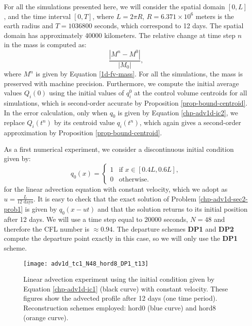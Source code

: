 For all the simulations presented here, we will consider the spatial domain $[0,L]$,
and the time interval $[0,T]$,  where $L = 2 \pi R$, $R = 6.371 \times 10^{6}$ meters is the earth radius and
$T = 1036800$ seconds, which correspond to 12 days. The spatial domain has approximately 40000 kilometers.
The relative change at time step $n$ in the mass is computed as:
\begin{equation*}
	\frac{|M^n-M^0|}{|M_0|},
\end{equation*}
where $M^n$ is given by Equation \eqref{1d-fv-mass}.
For all the simulations, the
mass is preserved with machine precision. Furthermore,
we compute the initial average values $Q_i(0)$ using
the initial values of $q^0_i$ at the control volume centroids for all simulations,
which is second-order accurate by Proposition \ref{prop-bound-centroid}. 
In the error calculation, only when $q_0$ is given by Equation \eqref{chp-adv1d-ic2},
we replace $Q_{i}(t^n)$ by its centroid value $q_{i}(t^n)$, which again gives
a second-order approximation by Proposition \ref{prop-bound-centroid}.

As a first numerical experiment, we consider
a discontinuous initial condition given by:
\begin{equation}
	\label{chp-adv1d-ic1}
		q_0(x) =  
  \begin{cases}
		1 & \text{if } x \in [0.4L,0.6L],\\
		0 & \text{otherwise}.
  \end{cases}
\end{equation}
for the linear advection equation with constant velocity, which we adopt as $u=\frac{L}{12 \text{ days}}$.
It is easy to check that the exact solution of Problem \ref{chp-adv1d-sec2-prob1} is given
by $q_0(x-ut)$ and that the solution returns to its initial position after 12 days.
We will use a time step equal to 20000 seconds, $N=48$ and therefore the CFL number is $\approx 0.94$.
The departure schemes \textbf{DP1} and \textbf{DP2} compute the departure point exactly in this case, so we will only use the \textbf{DP1} scheme.
\begin{figure}[!htb]
	\centering
	\texttt{[image: adv1d\_tc1\_N48\_hord8\_DP1\_t13]}
	\caption{Linear advection experiment using the initial condition given by Equation \eqref{chp-adv1d-ic1} (black curve) with constant velocity.
		These figures show the advected profile after 12 days (one time period).
		Reconstruction schemes employed: hord0 (blue curve) and hord8 (orange curve).\label{chp-adv1d-sec-exp-adv1}}
\end{figure}

